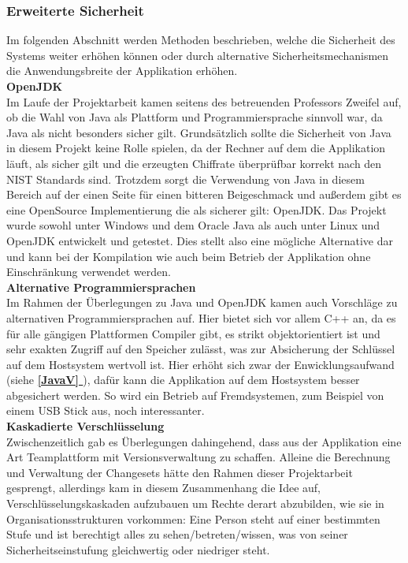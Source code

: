 \documentclass[12pt,a4paper,bibliography=totocnumbered,listof=totocnumbered]{scrartcl}
\newcommand*{\fullref}[1]{\textbf{\hyperref[{#1}]{\ref*{#1} \nameref*{#1}}}}
\begin{document}
\subsubsection{Erweiterte Sicherheit}
Im folgenden Abschnitt werden Methoden beschrieben, welche die Sicherheit des Systems weiter erhöhen können oder durch alternative Sicherheitsmechanismen die Anwendungsbreite der Applikation erhöhen.
\\\textbf{OpenJDK}\\
Im Laufe der Projektarbeit kamen seitens des betreuenden Professors Zweifel auf, ob die Wahl von Java als Plattform und Programmiersprache sinnvoll war, da Java als nicht besonders sicher gilt. Grundsätzlich sollte die Sicherheit von Java in diesem Projekt keine Rolle spielen, da der Rechner auf dem die Applikation läuft, als sicher gilt und die erzeugten Chiffrate überprüfbar korrekt nach den NIST Standards sind. Trotzdem sorgt die Verwendung von Java in diesem Bereich auf der einen Seite für einen bitteren Beigeschmack und außerdem gibt es eine OpenSource Implementierung die als sicherer gilt: OpenJDK. Das Projekt wurde sowohl unter Windows und dem Oracle Java als auch unter Linux und OpenJDK entwickelt und getestet. Dies stellt also eine mögliche Alternative dar und kann bei der Kompilation wie auch beim Betrieb der Applikation ohne Einschränkung verwendet werden. 
\\\textbf{Alternative Programmiersprachen}\\
Im Rahmen der Überlegungen zu Java und OpenJDK kamen auch Vorschläge zu alternativen Programmiersprachen auf. Hier bietet sich vor allem C++ an, da es für alle gängigen Plattformen Compiler gibt, es strikt objektorientiert ist und sehr exakten Zugriff auf den Speicher zulässt, was zur Absicherung der Schlüssel auf dem Hostsystem wertvoll ist. Hier erhöht sich zwar der Enwicklungsaufwand (siehe \fullref{JavaV}), dafür kann die Applikation auf dem Hostsystem besser abgesichert werden. So wird ein Betrieb auf Fremdsystemen, zum Beispiel von einem USB Stick aus, noch interessanter.
\\\textbf{Kaskadierte Verschlüsselung}\\
Zwischenzeitlich gab es Überlegungen dahingehend, dass aus der Applikation eine Art Teamplattform mit Versionsverwaltung zu schaffen. Alleine die Berechnung und Verwaltung der Changesets hätte den Rahmen dieser Projektarbeit gesprengt, allerdings kam in diesem Zusammenhang die Idee auf, Verschlüsselungskaskaden aufzubauen um Rechte derart abzubilden, wie sie in Organisationsstrukturen vorkommen: Eine Person steht auf einer bestimmten Stufe und ist berechtigt alles zu sehen/betreten/wissen, was von seiner Sicherheitseinstufung gleichwertig oder niedriger steht.
\end{document}
